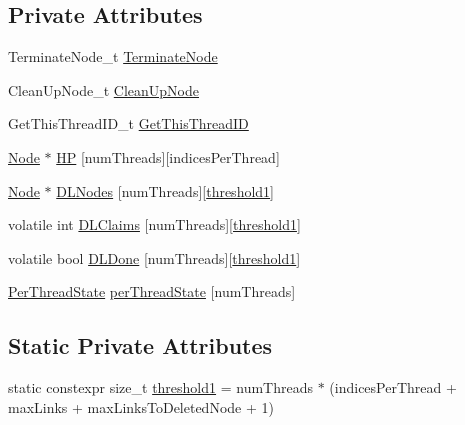 \subsection*{Private Attributes}
\begin{DoxyCompactItemize}
\item 
Terminate\+Node\+\_\+t \mbox{\hyperlink{class_n_u_c_a_r_lock_free_d_s_1_1_allocator_a14e7ae467e3fefce5ce92aa3017b1568}{Terminate\+Node}}
\item 
Clean\+Up\+Node\+\_\+t \mbox{\hyperlink{class_n_u_c_a_r_lock_free_d_s_1_1_allocator_ae185b38ec0a4ca4ccbe4ec0060ca834b}{Clean\+Up\+Node}}
\item 
Get\+This\+Thread\+I\+D\+\_\+t \mbox{\hyperlink{class_n_u_c_a_r_lock_free_d_s_1_1_allocator_adcefaf024a5ea626d6e045aab70057b9}{Get\+This\+Thread\+ID}}
\item 
\mbox{\hyperlink{class_n_u_c_a_r_lock_free_d_s_1_1_allocator_1_1_node}{Node}} $\ast$ \mbox{\hyperlink{class_n_u_c_a_r_lock_free_d_s_1_1_allocator_af296445f1e849188577b21cdc924b09e}{HP}} \mbox{[}num\+Threads\mbox{]}\mbox{[}indices\+Per\+Thread\mbox{]}
\item 
\mbox{\hyperlink{class_n_u_c_a_r_lock_free_d_s_1_1_allocator_1_1_node}{Node}} $\ast$ \mbox{\hyperlink{class_n_u_c_a_r_lock_free_d_s_1_1_allocator_a040473eedb2591853976bd963e8522e6}{D\+L\+Nodes}} \mbox{[}num\+Threads\mbox{]}\mbox{[}\mbox{\hyperlink{class_n_u_c_a_r_lock_free_d_s_1_1_allocator_a1d220e1cc963fc9fb37e46a416504715}{threshold1}}\mbox{]}
\item 
volatile int \mbox{\hyperlink{class_n_u_c_a_r_lock_free_d_s_1_1_allocator_aa50f17cb2e163dbd88a3fcb492b1dde2}{D\+L\+Claims}} \mbox{[}num\+Threads\mbox{]}\mbox{[}\mbox{\hyperlink{class_n_u_c_a_r_lock_free_d_s_1_1_allocator_a1d220e1cc963fc9fb37e46a416504715}{threshold1}}\mbox{]}
\item 
volatile bool \mbox{\hyperlink{class_n_u_c_a_r_lock_free_d_s_1_1_allocator_af93543d254eaef573bd4fb471c79ae29}{D\+L\+Done}} \mbox{[}num\+Threads\mbox{]}\mbox{[}\mbox{\hyperlink{class_n_u_c_a_r_lock_free_d_s_1_1_allocator_a1d220e1cc963fc9fb37e46a416504715}{threshold1}}\mbox{]}
\item 
\mbox{\hyperlink{class_n_u_c_a_r_lock_free_d_s_1_1_allocator_1_1_per_thread_state}{Per\+Thread\+State}} \mbox{\hyperlink{class_n_u_c_a_r_lock_free_d_s_1_1_allocator_aa04805cb0313b2b7cfd5c76830fdb0c8}{per\+Thread\+State}} \mbox{[}num\+Threads\mbox{]}
\end{DoxyCompactItemize}
\subsection*{Static Private Attributes}
\begin{DoxyCompactItemize}
\item 
static constexpr size\+\_\+t \mbox{\hyperlink{class_n_u_c_a_r_lock_free_d_s_1_1_allocator_a1d220e1cc963fc9fb37e46a416504715}{threshold1}} = num\+Threads $\ast$ (indices\+Per\+Thread + max\+Links + max\+Links\+To\+Deleted\+Node + 1)
\end{DoxyCompactItemize}


